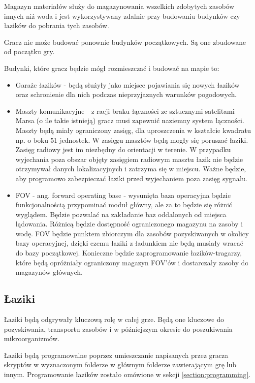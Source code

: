 \documentclass[a4paper,12pt]{article}
\begin{document}
Magazyn materiałów służy do magazynowania wszelkich zdobytych zasobów innych niż woda i jest wykorzystywany zdalnie przy budowaniu budynków czy łazików do pobrania tych zasobów.

Gracz nie może budować ponownie budynków początkowych. Są one zbudowane od początku gry.

Budynki, które gracz będzie mógł rozmieszczać i budować na mapie to:
\begin{itemize}
	\item Garaże łazików - będą służyły jako miejsce pojawiania się nowych łazików oraz schronienie dla nich podczas nieprzyjaznych warunków pogodowych.
	\item Maszty komunikacyjne - z racji braku łączności ze sztucznymi satelitami Marsa (o ile takie istnieją) gracz musi zapewnić naziemny system łączności. Maszty będą miały ograniczony zasięg, dla uproszczenia w kształcie kwadratu np. o boku 51 jednostek. W zasięgu masztów będą mogły się poruszać łaziki. Zasięg radiowy jest im niezbędny do orientacji w terenie. W przypadku wyjechania poza obszar objęty zasięgiem radiowym masztu łazik nie będzie otrzymywał danych lokalizacyjnych i zatrzyma się w miejscu. Ważne będzie, aby programowo zabezpieczać łaziki przed wyjechaniem poza zasięg sygnału.
	\item FOV - ang. forward operating base - wysunięta baza operacyjna będzie funkcjonalnością przypominać moduł główny, ale za to będzie się różnić wyglądem. Będzie pozwalać na zakładanie baz oddalonych od miejsca lądowania. Różnicą będzie dostępność ograniczonego magazynu na zasoby i wodę. FOV będzie punktem zbiorczym dla zasobów pozyskiwanych w okolicy bazy operacyjnej, dzięki czemu łaziki z ładunkiem nie będą musiały wracać do bazy początkowej. Konieczne będzie zaprogramowanie łazików-tragarzy, które będą opróżniały ograniczony magazyn FOV'ów i dostarczały zasoby do magazynów głównych.
\end{itemize}
\subsection{Łaziki}
Łaziki będą odgrywały kluczową rolę w całej grze. Będą one kluczowe do pozyskiwania, transportu zasobów i w późniejszym okresie do poszukiwania mikroorganizmów.

Łaziki będą programowalne poprzez umieszczanie napisanych przez gracza skryptów w wyznaczonym folderze w głównym folderze zawierającym grę lub innym. Programowanie łazików zostało omówione w sekcji \ref{section:programming}.
\end{document}
